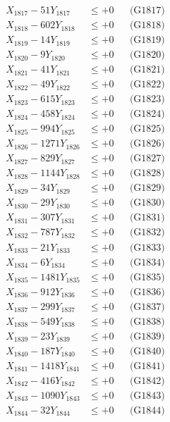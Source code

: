\documentclass[a4paper,10pt]{article}
\begin{document}
{\begin{align}
X_{1817} - 51Y_{1817} &\leq +0 && \text{(G1817)} \\
X_{1818} - 602Y_{1818} &\leq +0 && \text{(G1818)} \\
X_{1819} - 14Y_{1819} &\leq +0 && \text{(G1819)} \\
X_{1820} - 9Y_{1820} &\leq +0 && \text{(G1820)} \\
\allowbreak
X_{1821} - 41Y_{1821} &\leq +0 && \text{(G1821)} \\
X_{1822} - 49Y_{1822} &\leq +0 && \text{(G1822)} \\
X_{1823} - 615Y_{1823} &\leq +0 && \text{(G1823)} \\
X_{1824} - 458Y_{1824} &\leq +0 && \text{(G1824)} \\
X_{1825} - 994Y_{1825} &\leq +0 && \text{(G1825)} \\
X_{1826} - 1271Y_{1826} &\leq +0 && \text{(G1826)} \\
X_{1827} - 829Y_{1827} &\leq +0 && \text{(G1827)} \\
X_{1828} - 1144Y_{1828} &\leq +0 && \text{(G1828)} \\
X_{1829} - 34Y_{1829} &\leq +0 && \text{(G1829)} \\
X_{1830} - 29Y_{1830} &\leq +0 && \text{(G1830)} \\
\allowbreak
X_{1831} - 307Y_{1831} &\leq +0 && \text{(G1831)} \\
X_{1832} - 787Y_{1832} &\leq +0 && \text{(G1832)} \\
X_{1833} - 21Y_{1833} &\leq +0 && \text{(G1833)} \\
X_{1834} - 6Y_{1834} &\leq +0 && \text{(G1834)} \\
X_{1835} - 1481Y_{1835} &\leq +0 && \text{(G1835)} \\
X_{1836} - 912Y_{1836} &\leq +0 && \text{(G1836)} \\
X_{1837} - 299Y_{1837} &\leq +0 && \text{(G1837)} \\
X_{1838} - 549Y_{1838} &\leq +0 && \text{(G1838)} \\
X_{1839} - 23Y_{1839} &\leq +0 && \text{(G1839)} \\
X_{1840} - 187Y_{1840} &\leq +0 && \text{(G1840)} \\
\allowbreak
X_{1841} - 1418Y_{1841} &\leq +0 && \text{(G1841)} \\
X_{1842} - 416Y_{1842} &\leq +0 && \text{(G1842)} \\
X_{1843} - 1090Y_{1843} &\leq +0 && \text{(G1843)} \\
X_{1844} - 32Y_{1844} &\leq +0 && \text{(G1844)} \\

\end{align}}
\end{document}
